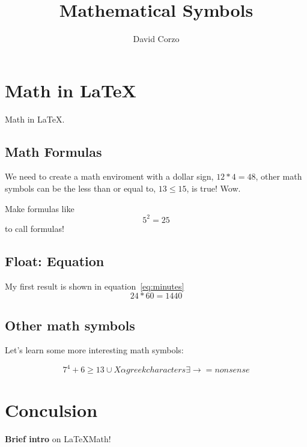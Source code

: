 \documentclass{article}
\title{Mathematical Symbols}
\author{David Corzo}
\date{}
\begin{document}
\maketitle	

\section{Math in \LaTeX}
 Math in \LaTeX.

\subsection{Math Formulas}
We need to create a math enviroment with a dollar sign, $12*4=48$, other math symbols can be the less than or equal to, $13 \leq 15$, is true! Wow.

Make formulas like \[5^2=25\] to call formulas!

\subsection{Float: Equation }

My first result is shown in equation~\ref{eq:minutes}
\begin{equation}
24*60=1440
\label{eq:minutes}
\end{equation}

\subsection{Other math symbols}

Let's learn some more interesting math symbols: 

\begin{equation}
7^4+6 \geq 13 \cup X \alpha greek characters \exists \rightarrow = nonsense
\label{RandomSimbols}
\end{equation}

\section{Conculsion}

\textbf{Brief intro} on \LaTeX Math!
\end{document}
